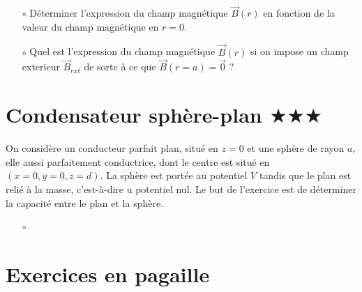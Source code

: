 \documentclass{report}
\begin{document}
\begin{itemize}

	\item[$\circ$] Déterminer l'expression du champ magnétique $\vec{B}(r)$ en fonction de la valeur du champ magnétique en $r=0$.
	\item[$\circ$] Quel est l'expression du champ magnétique $\vec{B}(r)$ si on impose un champ exterieur $\vec{B}_{ext}$ de sorte à ce que  $\vec{B}(r=a)=\vec{0}$ ?

\end{itemize}

\newpage

\section*{Condensateur sphère-plan $\bigstar\bigstar\bigstar$}

On considère un conducteur parfait plan, situé en $z=0$ et une sphère de rayon $a$, elle aussi parfaitement conductrice, dont le centre est situé en $(x=0, y=0, z=d)$. La sphère est portée au potentiel $V$ tandis que le plan est relié à la masse, c'est-à-dire u potentiel nul. Le but de l'exercice est de déterminer la capacité entre le plan et la sphère.

\begin{itemize}

	\item[$\circ$] 

\end{itemize}

\newpage

\section*{Exercices en pagaille}
\end{document}
